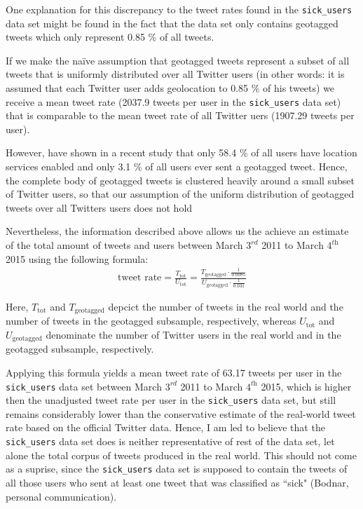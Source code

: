 \documentclass[11pt, a4paper,twoside]{report}\usepackage[]{graphicx}\usepackage[]{color}
\begin{document}
One explanation for this discrepancy to the tweet rates found in the \texttt{sick\_users} data set might be found in the fact that the data set only contains geotagged tweets which only represent 0.85 \% \citep{sloan2013knowing} of all tweets. 

If we make the naïve assumption that geotagged tweets represent a subset of all tweets that is uniformly distributed over all Twitter users (in other words: it is assumed that each Twitter user adds geolocation to 0.85 \% of his tweets) we receive a mean tweet rate (2037.9 tweets per user in the \texttt{sick\_users} data set) that is comparable to the mean tweet rate of all Twitter uers (1907.29 tweets per user).

However, \cite{sloan_who_2015} have shown in a recent study that only 58.4 \% of all users have location services enabled and only 3.1 \% of all users ever sent a geotagged tweet. Hence, the complete body of geotagged tweets is clustered heavily around a small subset of Twitter users, so that our assumption of the uniform distribution of geotagged tweets over all Twitters users does not hold

Nevertheless, the information described above allows us the achieve an estimate of the total amount of tweets and users between March $3^\textit{rd}$ 2011 to March $4^\textit{th}$ 2015 using the following formula:
  \begin{align}
\text{tweet rate} = \frac{T_{\text{tot}}}{U_\text{tot}} = \frac{T_{\text{geotagged}} \cdot \frac{1}{0.0085}}{U_\text{geotagged} \cdot \frac{1}{0.031}} \label{eq:1}
  \end{align}

Here, $T_\text{tot}$ and $T_\text{geotagged}$ depcict the number of tweets in the real world and the number of tweets in the geotagged subsample, respectively, whereas $U_\text{tot}$ and $U_\text{geotagged}$ denominate the number of Twitter users in the real world and in the geotagged subsample, respectively. 

Applying this formula yields a mean tweet rate of 63.17 tweets per user in the \texttt{sick\_users} data set between March $3^\textit{rd}$ 2011 to March $4^\textit{th}$ 2015, which is higher then the unadjusted tweet rate per user in the \texttt{sick\_users} data set, but still remains considerably lower than the conservative estimate of the real-world tweet rate based on the official Twitter data. Hence, I am led to believe that the \texttt{sick\_users} data set does is neither representative of rest of the data set, let alone the total corpus of tweets produced in the real world. This should not come as a suprise, since the \texttt{sick\_users} data set is supposed to contain the tweets of all those users who sent at least one tweet that was classified as ``sick" (Bodnar, personal communication).
\end{document}
